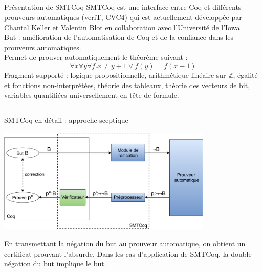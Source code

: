 \documentclass{beamer}
\begin{document}
    \subsection{}
    \begin{frame}{Présentation de SMTCoq}
      SMTCoq est une interface entre Coq et différents prouveurs automatiques (veriT, CVC4) qui est actuellement développée par Chantal Keller et Valentin Blot en collaboration avec l'Université de l'Iowa. \\
      \vspace*{3mm}
      But : amélioration de l'automatisation de Coq et de la confiance dans les prouveurs automatiques. \\
      \vspace*{3mm}
      Permet de prouver automatiquement le théorème suivant :
      \[ \forall x \forall y \forall f. x \neq y + 1 \vee f(y) = f(x-1) \]
      Fragment supporté : logique propositionnelle, arithmétique linéaire sur $\mathbb{Z}$, égalité et fonctions non-interprétées, théorie des tableaux, théorie des vecteurs de bit, variables quantifiées universellement en tête de formule.

    \end{frame}




    \subsection{}
    \begin{frame}{SMTCoq en détail : approche sceptique}

      \begin{center}
        \includegraphics[height=5cm]{smt_auto.pdf}
      \end{center}

      En transmettant la négation du but au prouveur automatique, on obtient un certificat prouvant l'absurde. Dans les cas d'application de SMTCoq, la double négation du but implique le but.


    \end{frame}
\end{document}
